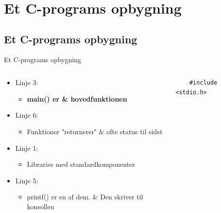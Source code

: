 \documentclass{beamer}
\begin{document}
\section{Et C-programs opbygning}
\subsection{Et C-programs opbygning}
\begin{frame}[fragile]{Et C-programs opbygning}
	\begin{columns}
	
	\begin{column}{0.5\textwidth}
	
	\begin{itemize}
	\item{Linje 3:}
		\begin{itemize}
		\item{\bf{main()} er & hovedfunktionen}
		\end{itemize}
	\end{itemize}
	
	\begin{itemize}
	\item{Linje 6:}
		\begin{itemize}
		\item{Funktioner "returnerer" & ofte status til sidst}
		\end{itemize}
	\end{itemize}
	
	\begin{itemize}
	\item{Linje 1:}
		\begin{itemize}
		\item{Libraries med standardkomponenter}
		\end{itemize}
	\end{itemize}
	
	\begin{itemize}
	\item{Linje 5:}
		\begin{itemize}
		\item{printf() er en af dem. & Den skriver til konsollen}
		\end{itemize}
	\end{itemize}
	
	\end{column}
	
	\begin{column}{0.4\textwidth}
	\begin{lstlisting}
	#include <stdio.h>


\end{lstlisting}
\end{column}
\end{columns}
\end{frame}
\end{document}
